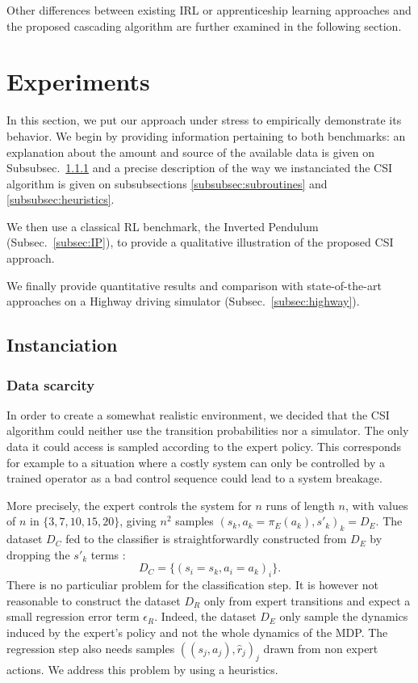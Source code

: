 \documentclass[smallextended]{svjour3}
\begin{document}
Other differences between existing IRL or apprenticeship learning approaches and the proposed cascading algorithm are further examined in the following section.

\section{Experiments}
\label{sec:experiments}
In this section, we put our approach under stress to empirically demonstrate its behavior. We begin by providing information pertaining to both benchmarks: an explanation about the amount and source of the available data is given on Subsubsec.~\ref{subsubsec:data} and a precise description of the way we instanciated the CSI algorithm is given on subsubsections \ref{subsubsec:subroutines} and \ref{subsubsec:heuristics}. 

We then use a classical RL benchmark, the Inverted Pendulum (Subsec.~\ref{subsec:IP}), to provide a qualitative illustration of the proposed CSI approach.

We finally provide quantitative results and comparison with state-of-the-art approaches on a Highway driving simulator (Subsec.~\ref{subsec:highway}).
\subsection{Instanciation}
\label{subsec:instanciation}
\subsubsection{Data scarcity}
\label{subsubsec:data}
In order to create a somewhat realistic environment, we decided that the CSI algorithm could neither use the transition probabilities nor a simulator. The only data it could access is sampled according to the expert policy. This corresponds for example to a situation where a costly system can only be controlled by a trained operator as a bad control sequence could lead to a system breakage.

More precisely, the expert controls the system for $n$ runs of length $n$, with values of $n$ in $\{3,7,10,15,20\}$, giving $n^2$ samples $(s_k,a_k=\pi_E(a_k),s'_k)_k = D_E$. The dataset $D_C$ fed to the classifier is straightforwardly constructed from $D_E$ by dropping the $s'_k$ terms :
\begin{equation}
  D_C = \{(s_i = s_k,a_i=a_k)_i\}.
\end{equation}
There is no particuliar problem for the classification step. It is however not reasonable to construct the dataset $D_R$ only from expert transitions and expect a small regression error term $\epsilon_R$. Indeed, the dataset $D_E$ only sample the dynamics induced by the expert's policy and not the whole dynamics of the MDP. The regression step also needs samples $((s_j,a_j),\hat r_j)_j$ drawn from non expert actions. We address this problem by using a heuristics.
\end{document}

